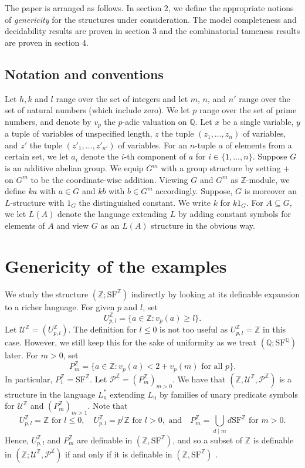 \documentclass[letterpaper]{amsart}
\newcommand{\qq}{\mathbb{Q}}
\newcommand{\zz}{\mathbb{Z}}
\newcommand{\sU}{\mathscr{U}}
\newcommand{\sP}{\mathscr{P}}
\newcommand{\SF}{\mathrm{SF}^\zz}
\newcommand{\SQ}{\mathrm{SF}^\qq}
\begin{document}
\noindent The paper is arranged as follows. In section 2, we define the appropriate notions of {\it genericity} for the structures under consideration. The model completeness and decidability results are proven in section 3 and the combinatorial tameness results are proven in section 4.

\medskip
\subsection*{Notation and conventions} Let $h, k$ and $l$ range over the set of integers and let  $m$, $n$, and $n'$ range over the set of natural numbers (which include zero). We let $p$ range over the set of prime numbers, and denote by $v_p$  the $p$-adic valuation on $\qq$.  Let $x$ be a single variable, $y$ a tuple of variables of unspecified length, $z$ the tuple $(z_1, \ldots, z_n)$ of variables, and $z'$ the tuple $(z'_1, \ldots, z'_{n'})$ of variables.  For an $n$-tuple $a$ of elements from a certain set, we let $a_i$ denote the $i$-th component of $a$ for $i \in \{1, \ldots, n\}$.  Suppose $G$ is an additive abelian group. We equip $G^m$ with a group structure by setting $+$ on $G^m$ to be the coordinate-wise addition. Viewing $G$ and $G^m$ as $\zz$-module, we define $ka$ with $a \in G$ and $kb$ with $b\in G^m$ accordingly. Suppose, $G$ is moreover an $L$-structure with $1_G$ the distinguished constant. We write $k$ for $k1_G$.  For $A \subseteq G$, we let $L(A)$ denote the language extending $L$ by adding constant symbols for elements of $A$ and view $G$ as an $L(A)$ structure in the obvious way.

\section{Genericity of the examples}
\noindent We study the structure $(\zz; \SF)$ indirectly by looking at its definable expansion to a richer language. For given $p$ and $l$, set 
$$U^\zz_{p, l} = \{ a \in \zz : v_p(a) \geq l\}.$$
Let $\sU^\zz = ( U^\zz_{p, l})$. The definition for $l \leq 0$ is not too useful as $U^\zz_{p, l} =\zz$ in this case. However, we still keep this for the sake of uniformity as we treat  $(\qq; \SQ)$ later. For $m>0$, set 
$$P^\zz_m = \{ a \in \zz : v_p(a) < 2 + v_p(m) \text{ for  all } p\}. $$ 
In particular,  $ P^\zz_1 = \SF$. Let $\sP^\zz = (P^\zz_m)_{m>0}$. We have that $(\zz, \sU^\zz, \sP^\zz)$ is a structure in the language $L_\mathrm{u}^*$ extending  $L_\mathrm{u}$ by families of unary predicate symbols for  $\sU^\zz$ and $( P^\zz_m)_{m>1}$. Note that $$U^\zz_{p,l}= \zz \text{ for } l\leq 0,\quad U^\zz_{p,l}= p^l\zz \text{ for } l>0, \text{ and} \quad   P^\zz_m =\bigcup_{d \mid m} d\SF \text{ for } m>0.$$ 
Hence, $U^\zz_{p, l}$ and $P^\zz_m$ are definable in   $( \zz, \SF)$, and so a subset of $\zz$ is definable in $(\zz; \sU^\zz, \sP^\zz)$ if and only if it is definable in $( \zz, \SF)$ .
\end{document}
